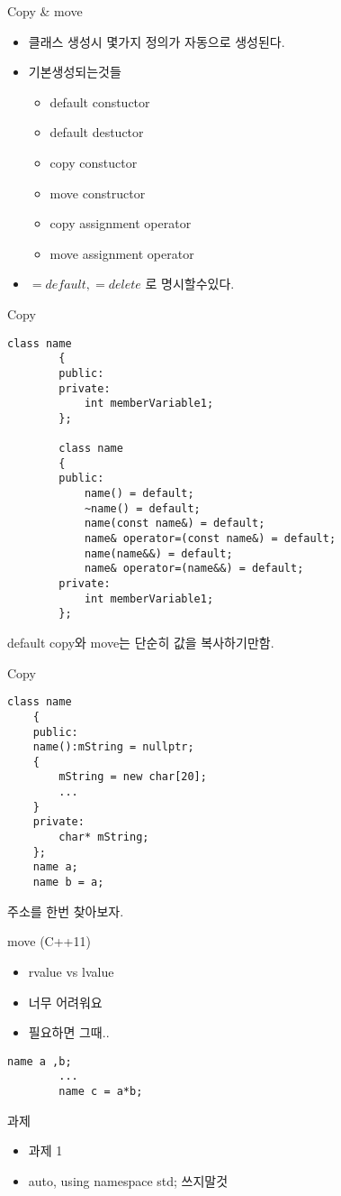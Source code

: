 \documentclass[10pt]{beamer}
\begin{document}
\begin{frame}{Copy \& move}
    \begin{itemize}
        \item 클래스 생성시 몇가지 정의가 자동으로 생성된다.
        \item 기본생성되는것들
        \begin{itemize}
            \item default constuctor
            \item default destuctor
            \item copy constuctor 
            \item move constructor
            \item copy assignment operator
            \item move assignment operator
        \end{itemize}
        \item $=default, =delete$ 로 명시할수있다.
    \end{itemize}
\end{frame}    


\begin{frame}[fragile]{Copy}
    \begin{lstlisting}[style = CStyle]
        class name
        {
        public:
        private:
            int memberVariable1;
        };

        class name
        {
        public:
            name() = default;
            ~name() = default;
            name(const name&) = default;
            name& operator=(const name&) = default;
            name(name&&) = default;
            name& operator=(name&&) = default;
        private:
            int memberVariable1;
        };
        \end{lstlisting}
        default copy와 move는 단순히 값을 복사하기만함.
\end{frame}



\begin{frame}[fragile]{Copy}
    \begin{lstlisting}[style = CStyle]
    class name
    {
    public:
    name():mString = nullptr;
    {
        mString = new char[20];
        ...
    }
    private:
        char* mString;
    };
    name a;
    name b = a;
    \end{lstlisting}
    주소를 한번 찾아보자.
\end{frame}



\begin{frame}[fragile] {move (C++11)}
    \begin{itemize}
        \item rvalue vs lvalue
        \item 너무 어려워요
        \item 필요하면 그때..
    \end{itemize}
    \begin{lstlisting}[style = CStyle]
        name a ,b;
        ...
        name c = a*b;
    \end{lstlisting}
\end{frame}

\begin{frame}{과제}
    \begin{itemize}
        \item 과제 1
        \item auto, using namespace std; 쓰지말것
    \end{itemize}
\end{frame}    
\end{document}
